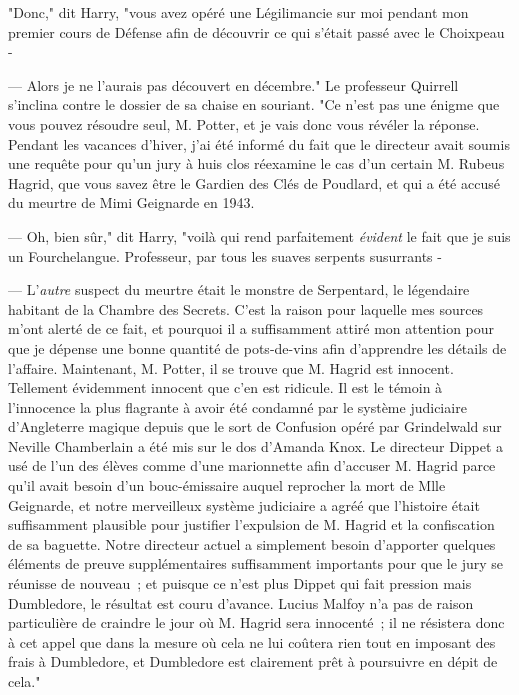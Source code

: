 "Donc," dit Harry, "vous avez opéré une Légilimancie sur moi pendant mon premier cours de Défense afin de découvrir ce qui s'était passé avec le Choixpeau -

--- Alors je ne l'aurais pas découvert en décembre." Le professeur Quirrell s'inclina contre le dossier de sa chaise en souriant. "Ce n'est pas une énigme que vous pouvez résoudre seul, M. Potter, et je vais donc vous révéler la réponse. Pendant les vacances d'hiver, j'ai été informé du fait que le directeur avait soumis une requête pour qu'un jury à huis clos réexamine le cas d'un certain M. Rubeus Hagrid, que vous savez être le Gardien des Clés de Poudlard, et qui a été accusé du meurtre de Mimi Geignarde en 1943.

--- Oh, bien sûr," dit Harry, "voilà qui rend parfaitement \emph{évident} le fait que je suis un Fourchelangue. Professeur, par tous les suaves serpents susurrants -

--- L'\emph{autre} suspect du meurtre était le monstre de Serpentard, le légendaire habitant de la Chambre des Secrets. C'est la raison pour laquelle mes sources m'ont alerté de ce fait, et pourquoi il a suffisamment attiré mon attention pour que je dépense une bonne quantité de pots-de-vins afin d'apprendre les détails de l'affaire. Maintenant, M. Potter, il se trouve que M. Hagrid est innocent. Tellement évidemment innocent que c'en est ridicule. Il est le témoin à l'innocence la plus flagrante à avoir été condamné par le système judiciaire d'Angleterre magique depuis que le sort de Confusion opéré par Grindelwald sur Neville Chamberlain a été mis sur le dos d'Amanda Knox. Le directeur Dippet a usé de l'un des élèves comme d'une marionnette afin d'accuser M. Hagrid parce qu'il avait besoin d'un bouc-émissaire auquel reprocher la mort de Mlle Geignarde, et notre merveilleux système judiciaire a agréé que l'histoire était suffisamment plausible pour justifier l'expulsion de M. Hagrid et la confiscation de sa baguette. Notre directeur actuel a simplement besoin d'apporter quelques éléments de preuve supplémentaires suffisamment importants pour que le jury se réunisse de nouveau~; et puisque ce n'est plus Dippet qui fait pression mais Dumbledore, le résultat est couru d'avance. Lucius Malfoy n'a pas de raison particulière de craindre le jour où M. Hagrid sera innocenté~; il ne résistera donc à cet appel que dans la mesure où cela ne lui coûtera rien tout en imposant des frais à Dumbledore, et Dumbledore est clairement prêt à poursuivre en dépit de cela."

